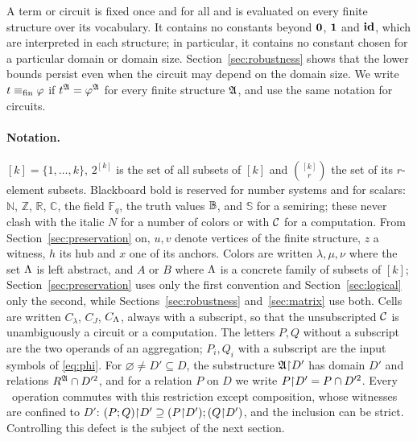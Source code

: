 A term or circuit is fixed once and for all and is evaluated on every finite
structure over its vocabulary. It contains no constants beyond $\mathbf{0}$,
$\mathbf{1}$ and $\mathbf{id}$, which are interpreted in each structure; in particular, it
contains no constant chosen for a particular domain or domain size.
Section~\ref{sec:robustness} shows that the lower bounds persist even when
the circuit may depend on the domain size. We write
$t\equiv_{\rm fin}\varphi$ if $t^{\mathfrak A}=\varphi^{\mathfrak A}$ for every finite
structure $\mathfrak A$, and use the same notation for circuits.

\paragraph{Notation.}
$[k]=\{1,\ldots,k\}$, $2^{[k]}$ is the set of all subsets of $[k]$ and
$\binom{[k]}{r}$ the set of its $r$-element subsets. Blackboard bold is
reserved for number systems and for scalars: $\mathbb N$, $\mathbb Z$,
$\mathbb R$, $\mathbb C$, the field $\mathbb F_q$, the truth values
$\mathbb B$, and $\mathbb S$ for a semiring; these never clash with the
italic $N$ for a number of colors or with $\mathcal C$ for a computation. From
Section~\ref{sec:preservation} on, $u,v$ denote vertices of the finite
structure, $z$ a witness, $h$ its hub and $x$ one of its anchors. Colors are
written $\lambda,\mu,\nu$ where the set $\Lambda$ is left abstract, and $A$ or
$B$ where $\Lambda$ is a concrete family of subsets of $[k]$;
Section~\ref{sec:preservation} uses only the first convention and
Section~\ref{sec:logical} only the second, while
Sections~\ref{sec:robustness} and~\ref{sec:matrix} use both. Cells are
written
$C_\lambda$, $C_J$, $C_\Lambda$,
always with a subscript, so that the unsubscripted $\mathcal C$ is unambiguously
a circuit or a computation. The letters $P,Q$ without a subscript are the
two operands of an aggregation; $P_i,Q_i$ with a subscript are the input
symbols of \eqref{eq:phi}. For
$\varnothing\ne D'\subseteq D$, the substructure $\mathfrak A\mathord{\restriction} D'$ has domain $D'$
and relations $R^{\mathfrak A}\cap D'^2$, and for a relation $P$ on $D$ we write
$P\mathord{\restriction} D'=P\cap D'^2$. Every \CoR\ operation commutes with this restriction
except composition, whose witnesses are confined to $D'$:
$(P;Q)\mathord{\restriction} D'\supseteq(P\mathord{\restriction} D');(Q\mathord{\restriction} D')$, and the inclusion can be
strict. Controlling this defect is the subject of the next section.
